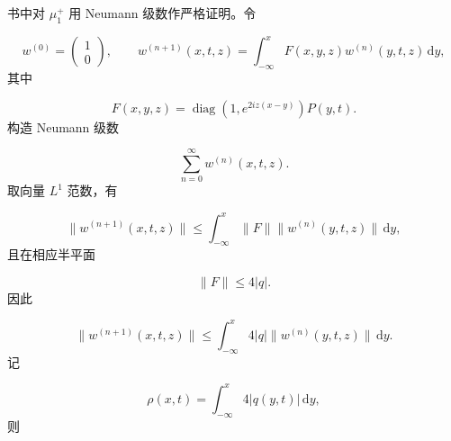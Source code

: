 \documentclass[
    lang=cn,
    scheme=chinese,
    mode=simple,
    device=normal,
    color=blue,
    math=cm,
    thmcnt=section,
    12pt
]{elegantbook}
\begin{document}
\begin{callout}
    书中对 $\mu_1^+$ 用 Neumann 级数作严格证明。令

    \begin{equation}
        w^{(0)}=\begin{pmatrix}1\\0\end{pmatrix},
        \qquad
        w^{(n+1)}(x,t,z)
        =
        \int_{-\infty}^{x}
        F(x,y,z)w^{(n)}(y,t,z)\,\mathrm dy,
        \tag{5.2.7}
        \label{eq:5.2.7}
    \end{equation}
    其中

    \begin{equation}
        F(x,y,z)
        =
        \operatorname{diag}\!\left(1,e^{2iz(x-y)}\right)P(y,t).
        \tag{5.2.8}
        \label{eq:5.2.8}
    \end{equation}
    构造 Neumann 级数

    \begin{equation}
        \sum\limits_{n=0}^{\infty}w^{(n)}(x,t,z).
        \tag{5.2.9}
        \label{eq:5.2.9}
    \end{equation}
    取向量 $L^1$ 范数，有

    \begin{equation}
        \lVert w^{(n+1)}(x,t,z)\rVert
        \le
        \int_{-\infty}^{x}
        \lVert F\rVert
        \lVert w^{(n)}(y,t,z)\rVert\,\mathrm dy,
        \tag{5.2.10}
        \label{eq:5.2.10}
    \end{equation}
    且在相应半平面

    \begin{equation}
        \lVert F\rVert\le4\lvert q\rvert.
        \tag{5.2.11}
        \label{eq:5.2.11}
    \end{equation}
    因此

    \begin{equation}
        \lVert w^{(n+1)}(x,t,z)\rVert
        \le
        \int_{-\infty}^{x}
        4\lvert q\rvert
        \lVert w^{(n)}(y,t,z)\rVert\,\mathrm dy.
        \tag{5.2.12}
        \label{eq:5.2.12}
    \end{equation}
    记

    \begin{equation}
        \rho(x,t)
        =
        \int_{-\infty}^{x}4\lvert q(y,t)\rvert\,\mathrm dy,
        \tag{5.2.13}
        \label{eq:5.2.13}
    \end{equation}
    则


\end{callout}
\end{document}
